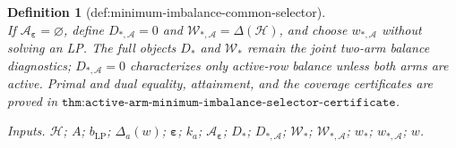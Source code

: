 \documentclass{article}
\newtheorem{definition}{Definition}
\begin{document}
\begin{definition}[def:minimum-imbalance-common-selector]
\[\]
If \(\mathcal A_{\boldsymbol\varepsilon}=\varnothing\), define \(D_{*,\mathcal A}=0\) and \(\mathcal W_{*,\mathcal A}=\Delta(\mathcal H)\), and choose \(w_{*,\mathcal A}\) without solving an LP. The full objects \(D_*\) and \(\mathcal W_*\) remain the joint two-arm balance diagnostics; \(D_{*,\mathcal A}=0\) characterizes only active-row balance unless both arms are active. Primal and dual equality, attainment, and the coverage certificates are proved in \(\texttt{thm:active-arm-minimum-imbalance-selector-certificate}\).
\par\smallskip\noindent\emph{Inputs.} \(\mathcal H\); \(A\); \(b_{\mathrm{LP}}\); \(\Delta_a(w)\); \(\boldsymbol\varepsilon\); \(k_a\); \(\mathcal A_{\boldsymbol\varepsilon}\); \(D_*\); \(D_{*,\mathcal A}\); \(\mathcal W_*\); \(\mathcal W_{*,\mathcal A}\); \(w_*\); \(w_{*,\mathcal A}\); \(w\).
\end{definition}
\end{document}
